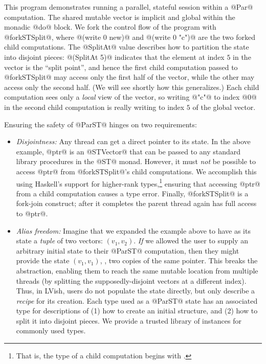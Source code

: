 This program demonstrates running a parallel, stateful session within
a @Par@ computation.  The shared mutable vector is implicit and global
within the monadic @do@ block.  We fork the control flow of the
program with @forkSTSplit@, where @(write 0 new)@ and @(write 0 "c")@
are the two forked child computations.  The @SplitAt@ value describes
how to partition the state into disjoint pieces: @(SplitAt 5)@
indicates that the element at index $5$ in the vector is the ``split
point'', and hence the first child computation passed to @forkSTSplit@
may access only the first half of the vector, while the other may
access only the second half.  (We will see shortly how this
generalizes.)  Each child computation sees only a \emph{local} view of
the vector, so writing @"c"@ to index @0@ in the second child
computation is really writing to index $5$ of the global vector.

Ensuring the safety of @ParST@ hinges on two requirements:

\begin{itemize}
\item \emph{Disjointness:} Any thread can get a direct pointer to its
  state.  In the above example, @ptr@ is an @STVector@ that can be
  passed to any standard library procedures in the @ST@ monad.
  However, it must \emph{not} be possible to access @ptr@ from
  @forkSTSplit@'s child computations.  We accomplish this using
  Haskell's support for higher-rank types,\footnote{That is, the type
    of a child computation begins with .} ensuring that accessing @ptr@ from a child
  computation causes a type error.  Finally, @forkSTSplit@ is a
  fork-join construct; after it completes the parent thread again has
  full access to @ptr@.

\item \emph{Alias freedom:} Imagine that we expanded the example above
  to have as its state a \emph{tuple} of two vectors: $(v_1,v_2)$.
  \emph{If} we allowed the user to supply an arbitrary initial state
  to their @ParST@ computation, then they might provide the state
  $(v_1, v_1)$, \ie, two copies of the same pointer.  This breaks the
  abstraction, enabling them to reach the same mutable location from
  multiple threads (by splitting the supposedly-disjoint vectors at a
  different index).  Thus, in LVish, users do not populate the state
  directly, but only describe a \emph{recipe} for its creation.  Each
  type used as a @ParST@ state has an associated type for descriptions
  of (1) how to create an initial structure, and (2) how to split it
  into disjoint pieces.  We provide a trusted library of instances for
  commonly used types.
\end{itemize}

